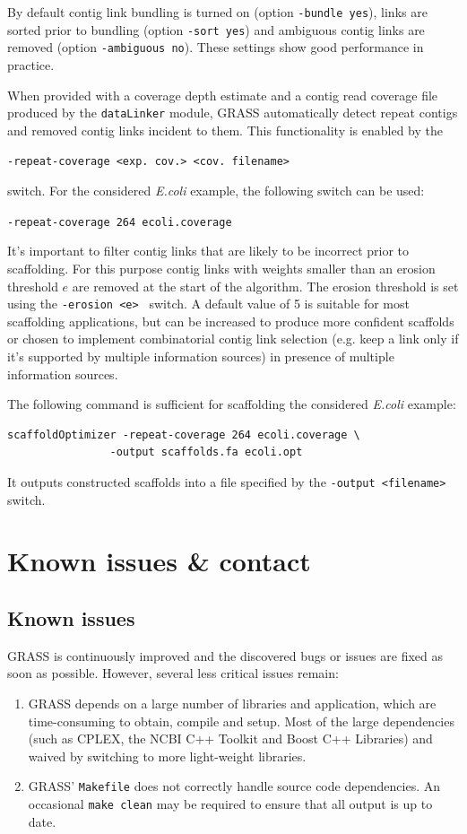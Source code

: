 \documentclass[12pt, a4paper]{report}
\begin{document}
By default contig link bundling is turned on (option \verb=-bundle yes=), links are sorted prior to bundling (option \verb=-sort yes=) and ambiguous contig links are removed (option \verb=-ambiguous no=). These settings show good performance in practice.

When provided with a coverage depth estimate and a contig read coverage file produced by the \verb=dataLinker= module, GRASS automatically detect repeat contigs and removed contig links incident to them. This functionality is enabled by the
\begin{center}
\verb=-repeat-coverage <exp. cov.> <cov. filename>=
\end{center}
switch. For the considered \emph{E.coli} example, the following switch can be used:
\begin{center}
\verb=-repeat-coverage 264 ecoli.coverage =
\end{center}

It's important to filter contig links that are likely to be incorrect prior to scaffolding. For this purpose contig links with weights smaller than an erosion threshold $e$ are removed at the start of the algorithm. The erosion threshold is set using the \verb=-erosion <e> = switch. A default value of 5 is suitable for most scaffolding applications, but can be increased to produce more confident scaffolds or chosen to implement combinatorial contig link selection (e.g. keep a link only if it's supported by multiple information sources) in presence of multiple information sources.

The following command is sufficient for scaffolding the considered \emph{E.coli} example:
\begin{center}
\begin{verbatim}
scaffoldOptimizer -repeat-coverage 264 ecoli.coverage \
                -output scaffolds.fa ecoli.opt
\end{verbatim}
\end{center}
It outputs constructed scaffolds into a file specified by the \verb=-output <filename>= switch.

\chapter{Known issues \& contact}
\section{Known issues}
GRASS is continuously improved and the discovered bugs or issues are fixed as soon as possible. However, several less critical issues remain:
\begin{enumerate}
\item GRASS depends on a large number of libraries and application, which are time-consuming to obtain, compile and setup. Most of the large dependencies (such as CPLEX, the NCBI C++ Toolkit and Boost C++ Libraries) and waived by switching to more light-weight libraries.
\item GRASS' \verb=Makefile= does not correctly handle source code dependencies. An occasional \verb=make clean= may be required to ensure that all output is up to date.
\end{enumerate}
\end{document}
